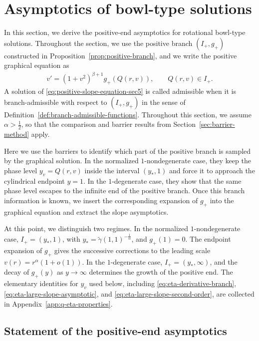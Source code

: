 \documentclass{amsart}
\theoremstyle{plain}
\theoremstyle{mainintrothm}
\theoremstyle{definition}
\begin{document}
	\section{Asymptotics of bowl-type solutions}
	\label{sec:positive-branch-asymptotics}
	
	In this section, we derive the positive-end asymptotics for rotational
	bowl-type solutions.  Throughout the section, we use the positive branch
	$(I_+,g_+)$ constructed in Proposition~\ref{prop:positive-branch}, and we
	write the positive graphical equation as
	\begin{align}
		\label{eq:positive-slope-equation-sec5}
		v'
		=
		(1+v^2)^{\beta+1}g_+(Q(r,v)),
		\qquad
		Q(r,v)\in I_+.
	\end{align}
	A solution of \eqref{eq:positive-slope-equation-sec5} is called admissible
	when it is branch-admissible with respect to $(I_+,g_+)$ in the sense of
	Definition~\ref{def:branch-admissible-functions}.  Throughout this section, we
	assume $\alpha>\frac{1}{2}$, so that the comparison and barrier results from
	Section~\ref{sec:barrier-method} apply.
	
	\medskip
	
	Here we use the barriers to identify which part of the positive branch is sampled by
	the graphical solution.  In the normalized $1$-nondegenerate case, they keep the
	phase level $y_v=Q(r,v)$ inside the interval $(y_*,1)$ and force it to approach
	the cylindrical endpoint $y=1$.  In the $1$-degenerate case, they show that the
	same phase level escapes to the infinite end of the positive branch.  Once this
	branch information is known, we insert the corresponding expansion of $g_+$
	into the graphical equation and extract the slope asymptotics.
	
	\medskip
	
	At this point, we distinguish two regimes.  In the normalized $1$-nondegenerate case,
	$I_+=(y_*,1)$, with
	$y_*=\widetilde\gamma(1,1)^{-\frac{1}{\alpha}}$, and $g_+(1)=0$.  The endpoint
	expansion of $g_+$ gives the successive corrections to the leading scale
	$v(r)=r^\alpha(1+o(1))$.  In the $1$-degenerate case,
	$I_+=(y_*,\infty)$, and the decay of $g_+(y)$ as $y\to\infty$ determines the
	growth of the positive end.  The elementary identities for $y_v$ used below,
	including \eqref{eq:eta-derivative-branch},
	\eqref{eq:eta-large-slope-asymptotic}, and
	\eqref{eq:eta-large-slope-second-order}, are collected in
	Appendix~\ref{app:q-eta-properties}.
	
	\subsection{Statement of the positive-end asymptotics}\,
	\label{subsec:positive-end-asymptotics-statement}
	
\end{document}
